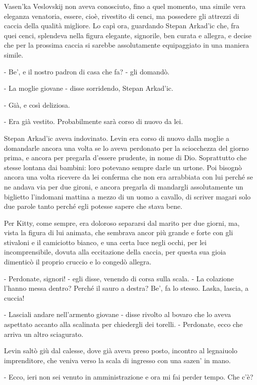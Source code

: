 Vasen'ka Veslovskij non aveva conosciuto, fino a quel momento, una simile vera eleganza venatoria, essere, cioè, rivestito di cenci, ma possedere gli attrezzi di caccia della qualità migliore. Lo capì ora, guardando Stepan Arkad'ic che, fra quei cenci, splendeva nella figura elegante, signorile, ben curata e allegra, e decise che per la prossima caccia si sarebbe assolutamente equipaggiato in una maniera simile. 

- Be', e il nostro padron di casa che fa? - gli domandò. 

- La moglie giovane - disse sorridendo, Stepan Arkad'ic. 

- Già, e così deliziosa. 

- Era già vestito. Probabilmente sarà corso di nuovo da lei. 

Stepan Arkad'ic aveva indovinato. Levin era corso di nuovo dalla moglie a domandarle ancora una volta se lo aveva perdonato per la sciocchezza del giorno prima, e ancora per pregarla d'essere prudente, in nome di Dio. Soprattutto che stesse lontana dai bambini: loro potevano sempre darle un urtone. Poi bisognò ancora una volta ricevere da lei conferma che non era arrabbiata con lui perché se ne andava via per due gironi, e ancora pregarla di mandargli assolutamente un biglietto l'indomani mattina a mezzo di un uomo a cavallo, di scriver magari solo due parole tanto perché egli potesse sapere che stava bene. 

Per Kitty, come sempre, era doloroso separarsi dal marito per due giorni, ma, vista la figura di lui animata, che sembrava ancor più grande e forte con gli stivaloni e il camiciotto bianco, e una certa luce negli occhi, per lei incomprensibile, dovuta alla eccitazione della caccia, per questa sua gioia dimenticò il proprio cruccio e lo congedò allegra. 

- Perdonate, signori! - egli disse, venendo di corsa sulla scala. - La colazione l'hanno messa dentro? Perché il sauro a destra? Be', fa lo stesso. Laska, lascia, a cuccia! 

- Lasciali andare nell'armento giovane - disse rivolto al bovaro che lo aveva aspettato accanto alla scalinata per chiedergli dei torelli. - Perdonate, ecco che arriva un altro sciagurato. 

Levin saltò giù dal calesse, dove già aveva preso posto, incontro al legnaiuolo imprenditore, che veniva verso la scala di ingresso con una sazen' in mano. 

- Ecco, ieri non sei venuto in amministrazione e ora mi fai perder tempo. Che c'è? 

